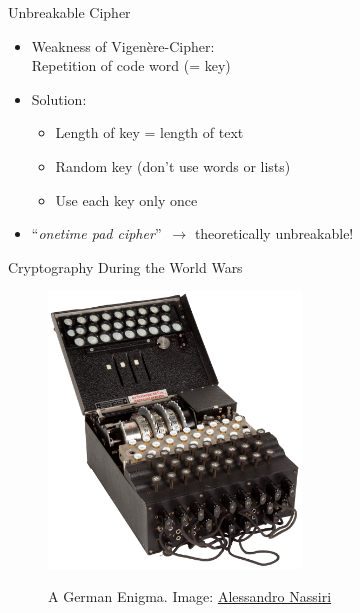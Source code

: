 \documentclass[]{beamer}
\begin{document}
\begin{frame}{Unbreakable Cipher}
	\begin{itemize}
		\item<1-> Weakness of Vigenère-Cipher:\\ Repetition of code word (= key)
		\item<2-> Solution: 
		\begin{itemize}
			\item<2-> Length of key = length of text
			\item<3-> Random key (don't use words or lists)
			\item<4-> Use each key only once
		\end{itemize}
		\item<5-> ``\textit{onetime pad cipher}''\ \(\rightarrow\) theoretically unbreakable!
	\end{itemize}
\end{frame}

\begin{frame}{Cryptography During the World Wars}
	\begin{figure}
		\centering
		\includegraphics[width = 0.6\textwidth]{../assets/images/Enigma}
		\label{fig:Enigma}
		\caption{A German Enigma. Image: \href{https://de.wikipedia.org/wiki/Datei:Enigma_(crittografia)_-_Museo_scienza_e_tecnologia_Milano.jpg}{Alessandro Nassiri}}
	\end{figure}
\end{frame}
\end{document}
